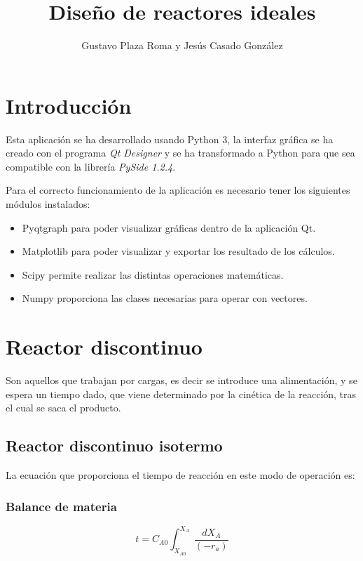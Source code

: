 \documentclass[20pt,a4paper]{extarticle}
\title{Diseño de reactores ideales}
\author{Gustavo Plaza Roma y Jesús Casado González}
\begin{document}
\maketitle

\setcounter{tocdepth}{2} %

\section{Introducción}
	Esta aplicación se ha desarrollado usando Python 3, la interfaz gráfica se ha creado con el programa \textit{Qt Designer} y se ha transformado a Python para que sea compatible con la librería \textit{PySide 1.2.4}. 
	
	Para el correcto funcionamiento de la aplicación es necesario tener los siguientes módulos instalados:
	\begin{itemize}
		\item Pyqtgraph para poder visualizar gráficas dentro de la aplicación Qt.
		\item Matplotlib para poder visualizar y exportar los resultado de los cálculos.
		\item Scipy permite realizar las distintas operaciones matemáticas.
		\item Numpy proporciona las clases necesarias para operar con vectores.
	\end{itemize}


\section{Reactor discontinuo}
	
	Son aquellos que trabajan por cargas, es decir se introduce una alimentación, y se espera un tiempo dado, que viene determinado por la cinética de la reacción, tras el cual se saca el producto.
	
	\subsection{Reactor discontinuo isotermo}
		La ecuación que proporciona el tiempo de reacción en este modo de operación es:
		
		\subsubsection{Balance de materia}
			\begin{equation*}
				t = C_{A0}\int_{X_{A0}}^{X_A}\frac{dX_A}{(-r_a)}
			\end{equation*}
		
\end{document}
